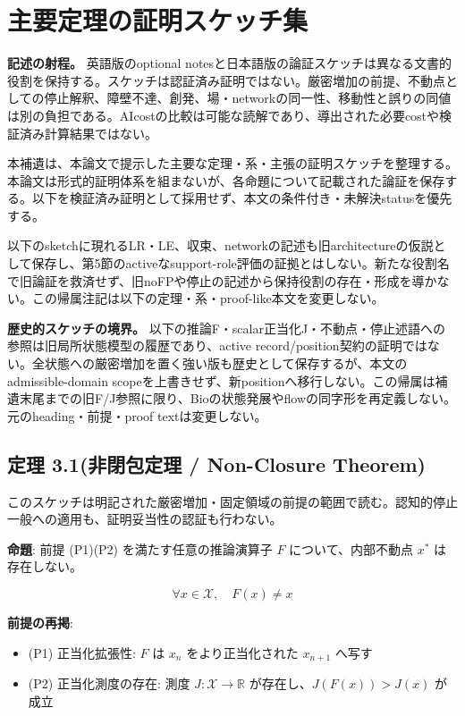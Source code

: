 \section{主要定理の証明スケッチ集}

\noindent\textbf{記述の射程。} 英語版のoptional notesと日本語版の論証スケッチは異なる文書的役割を保持する。スケッチは認証済み証明ではない。厳密増加の前提、不動点としての停止解釈、障壁不達、創発、場・networkの同一性、移動性と誤りの同値は別の負担である。AIcostの比較は可能な読解であり、導出された必要costや検証済み計算結果ではない。



本補遺は、本論文で提示した主要な定理・系・主張の証明スケッチを整理する。本論文は形式的証明体系を組まないが、各命題について記載された論証を保存する。以下を検証済み証明として採用せず、本文の条件付き・未解決statusを優先する。

以下のsketchに現れるLR・LE、収束、networkの記述も旧architectureの仮説として保存し、第5節のactiveなsupport-role評価の証拠とはしない。新たな役割名で旧論証を救済せず、旧noFPや停止の記述から保持役割の存在・形成を導かない。この帰属注記は以下の定理・系・proof-like本文を変更しない。

\bigskip


\noindent\textbf{歴史的スケッチの境界。} 以下の推論F・scalar正当化J・不動点・停止述語への参照は旧局所状態模型の履歴であり、active record/position契約の証明ではない。全状態への厳密増加を置く強い版も歴史として保存するが、本文のadmissible-domain scopeを上書きせず、新positionへ移行しない。この帰属は補遺末尾までの旧F/J参照に限り、Bioの状態発展やflowの同字形を再定義しない。元のheading・前提・proof textは変更しない。

\subsection{定理 3.1(非閉包定理 / Non-Closure Theorem)}

このスケッチは明記された厳密増加・固定領域の前提の範囲で読む。認知的停止一般への適用も、証明妥当性の認証も行わない。


\textbf{命題}: 前提 (P1)(P2) を満たす任意の推論演算子 $F$ について、内部不動点 $x^*$ は存在しない。

\[
\forall x \in \mathcal{X}, \quad F(x) \neq x
\]

\textbf{前提の再掲}:
\begin{itemize}
\item (P1) 正当化拡張性: $F$ は $x_n$ をより正当化された $x_{n+1}$ へ写す
\item (P2) 正当化測度の存在: 測度 $J: \mathcal{X} \to \mathbb{R}$ が存在し、$J(F(x)) > J(x)$ が成立
\end{itemize}


